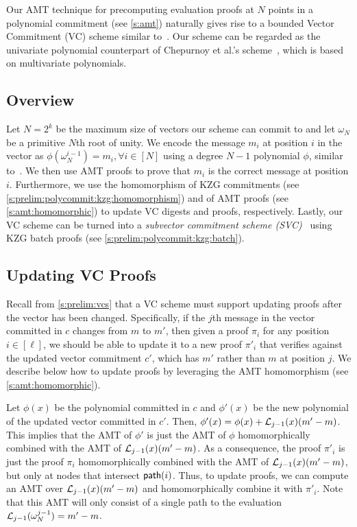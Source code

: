 Our AMT technique for precomputing evaluation proofs at $N$ points in a polynomial commitment (see \cref{s:amt}) naturally gives rise to a bounded Vector Commitment (VC) scheme similar to~\cite{CF13,CPZ18}.
Our scheme can be regarded as the univariate polynomial counterpart of Chepurnoy et al.'s scheme~\cite{CPZ18}, which is based on multivariate polynomials.

\subsection{Overview}
Let $N=2^k$ be the maximum size of vectors our scheme can commit to and let $\omega_N$ be a primitive $N$th root of unity.
We encode the message $m_i$ at position $i$ in the vector as $\phi(\omega_N^{i-1})=m_i,\forall i\in[N]$ using a degree $N-1$ polynomial $\phi$, similar to~\cite{CDHK15}.
We then use AMT proofs to prove that $m_i$ is the correct message at position $i$.
Furthermore, we use the homomorphism of KZG commitments (see \cref{s:prelim:polycommit:kzg:homomorphism}) and of AMT proofs (see \cref{s:amt:homomorphic}) to update VC digests and proofs, respectively.
Lastly, our VC scheme can be turned into a \textit{subvector commitment scheme (SVC)}~\cite{LM18} using KZG batch proofs (see \cref{s:prelim:polycommit:kzg:batch}).

\subsection{Updating VC Proofs}
\label{s:vcs:from-amt:updating-proofs}
Recall from \cref{s:prelim:vcs} that a VC scheme must support updating proofs after the vector has been changed.
Specifically, if the $j$th message in the vector committed in $c$ changes from $m$ to $m'$, then given a proof $\pi_i$ for any position $i\in[\ell]$, we should be able to update it to a new proof $\pi'_i$ that verifies against the updated vector commitment $c'$, which has $m'$ rather than $m$ at position $j$.
We describe below how to update proofs by leveraging the AMT homomorphism (see \cref{s:amt:homomorphic}).

Let $\phi(x)$ be the polynomial committed in $c$ and $\phi'(x)$ be the new polynomial of the updated vector committed in $c'$.
Then, $\phi'(x)=\phi(x) + \mathcal{L}_{j-1}(x)(m'-m)$.
This implies that the AMT of $\phi'$ is just the AMT of $\phi$ homomorphically combined with the AMT of $\mathcal{L}_{j-1}(x)(m'-m)$.
As a consequence, the proof $\pi'_i$ is just the proof $\pi_i$ homomorphically combined with the AMT of $\mathcal{L}_{j-1}(x)(m'-m)$, but only at nodes that intersect $\mathsf{path}(i)$.
Thus, to update proofs, we can compute an AMT over $\mathcal{L}_{j-1}(x)(m'-m)$ and homomorphically combine it with $\pi'_i$.
Note that this AMT will only consist of a single path to the evaluation $\mathcal{L}_{j-1}(\omega_N^{j-1})=m'-m$.

